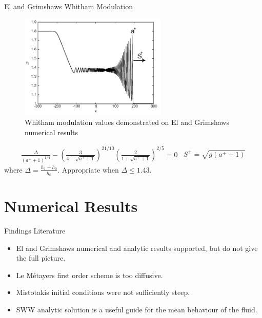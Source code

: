 \documentclass[pdf]{beamer}
\begin{document}
\begin{frame}{El and Grimshaws Whitham Modulation}
	
		\begin{figure}
			\centering
			\includegraphics[width=7cm]{../Pics/Diagrams/ElValsDiagram.png}
			\caption{Whitham modulation values demonstrated on El and Grimshaws numerical results}
			\label{fig:ELmod}
		\end{figure}
		
	
\end{frame}

\begin{frame}
	\begin{subequations}
		\begin{gather*}
		\frac{\Delta}{\left(a^+ + 1\right)^{1/4}} - \left(\frac{3}{4 -  \sqrt{a^+ + 1}}\right)^{21/10} \left(\frac{2}{1 + \sqrt{a^+ + 1}}\right)^{2/5} = 0
		\label{eq:aplusdef}
		\end{gather*}
		\begin{gather*}
		S^+ = \sqrt{g \left(a^+ + 1\right)}
		\label{eq:splusdef}
		\end{gather*}
	\end{subequations}
	where $\Delta = \frac{h_1 - h_0}{h_0}$. Appropriate when  $\Delta \le 1.43$.
	
\end{frame}

\section{Numerical Results}
\begin{frame}{Findings}
	Literature
	\begin{itemize}
		\item El and Grimshaws numerical and analytic results supported, but do not give the full picture.
		\item Le M\'{e}tayers first order scheme is too diffusive.
		\item Mistotakis initial conditions were not sufficiently steep.
		\item SWW analytic solution is a useful guide for the mean behaviour of the fluid.
	\end{itemize}	
\end{frame}
\end{document}
